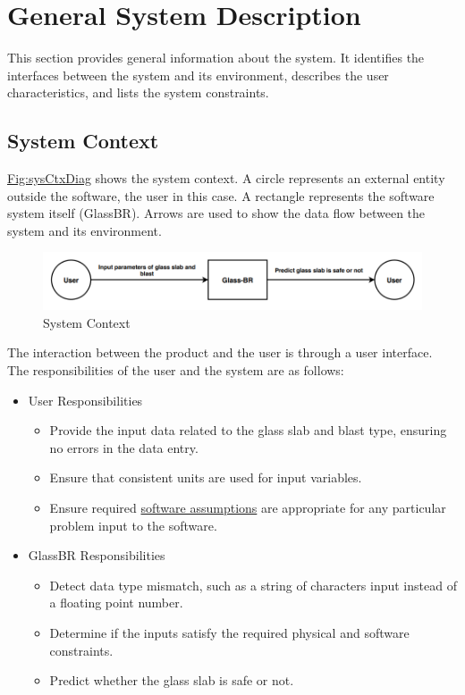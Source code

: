 \documentclass[12pt]{article}
\begin{document}
\section{General System Description}
\label{Sec:GenSysDesc}
This section provides general information about the system. It identifies the interfaces between the system and its environment, describes the user characteristics, and lists the system constraints.

\subsection{System Context}
\label{Sec:SysContext}
\hyperref[Figure:sysCtxDiag]{Fig:sysCtxDiag} shows the system context. A circle represents an external entity outside the software, the user in this case. A rectangle represents the software system itself (GlassBR). Arrows are used to show the data flow between the system and its environment.

\begin{figure}[H]
\begin{center}
\includegraphics[width=\textwidth]{../../../../datafiles/glassbr/SystemContextFigure.png}
\caption{System Context}
\label{Figure:sysCtxDiag}
\end{center}
\end{figure}
The interaction between the product and the user is through a user interface. The responsibilities of the user and the system are as follows:

\begin{itemize}
\item{User Responsibilities}
\begin{itemize}
\item{Provide the input data related to the glass slab and blast type, ensuring no errors in the data entry.}
\item{Ensure that consistent units are used for input variables.}
\item{Ensure required \hyperref[Sec:Assumps]{software assumptions} are appropriate for any particular problem input to the software.}
\end{itemize}
\item{GlassBR Responsibilities}
\begin{itemize}
\item{Detect data type mismatch, such as a string of characters input instead of a floating point number.}
\item{Determine if the inputs satisfy the required physical and software constraints.}
\item{Predict whether the glass slab is safe or not.}
\end{itemize}
\end{itemize}
\end{document}
